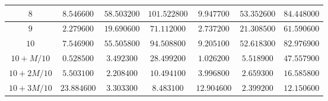\begin{landscape}
\begin{tabular}{|c|c|c|c|c|c|c|}
$8$          & $8.546600$                                                   & $58.503200$                                                  & $101.522800$                                                 & $9.947700$                                                         & $53.352600$                                                        & \multicolumn{1}{c|}{$84.448000$}                                                        \\ \hline
$9$          & $2.279600$                                                   & $19.690600$                                                  & $71.112000$                                                  & $2.737200$                                                         & $21.308500$                                                        & \multicolumn{1}{c|}{$61.590600$}                                                        \\ \hline
$10$         & $7.546900$                                                   & $55.505800$                                                  & $94.508800$                                                  & $9.205100$                                                         & $52.618300$                                                        & \multicolumn{1}{c|}{$82.976900$}                                                        \\ \hline
$10 + M/10$  & $0.528500$                                                   & $3.492300$                                                   & $28.499200$                                                  & $1.026200$                                                         & $5.518900$                                                         & \multicolumn{1}{c|}{$47.557900$}                                                        \\ \hline
$10 + 2M/10$ & $5.503100$                                                   & $2.208400$                                                   & $10.494100$                                                  & $3.996800$                                                         & $2.659300$                                                         & \multicolumn{1}{c|}{$16.585800$}                                                        \\ \hline
$10 + 3M/10$ & $23.884600$                                                  & $3.303300$                                                   & $8.483100$                                                   & $12.904600$                                                        & $2.399200$                                                         & \multicolumn{1}{c|}{$12.150600$}                                                        \\ \hline

\end{tabular}
\end{landscape}
